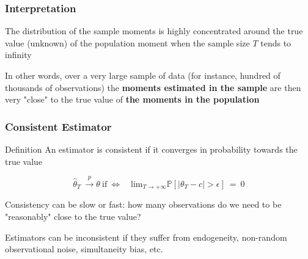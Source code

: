 \documentclass{beamer}
\newenvironment{wideitemize}{\itemize\addtolength{\itemsep}{10pt}}{\enditemize}
\newenvironment{wideenumerate}{\enumerate\addtolength{\itemsep}{10pt}}{\endenumerate}
\begin{document}
  \begin{frame}
    \frametitle{Interpretation}
    \begin{wideenumerate}
    \item The distribution of the sample moments is highly concentrated around the true value (unknown) of the population moment when the sample size $T$ tends to infinity
    \item In other words, over a very large sample of data (for instance, hundred of thousands of observations) the \textbf{moments estimated in the sample} are then very "close" to the true value of \textbf{the moments in the population}
    \end{wideenumerate}
  \end{frame}
  

  \begin{frame}
    \frametitle{Consistent Estimator}
    \begin{alertblock}{Definition}
      An estimator is consistent if it converges in probability towards the true value

      \begin{equation*}
        \hat{\theta}_T \ \overset{p}{\to} \theta \ \text{if} \ \Leftrightarrow \quad \text{lim}_{T \to +\infty} \mathbb{P} \left[ |\theta_T - c| > \epsilon \right] \ = \ 0      
      \end{equation*}
    \end{alertblock}

    \begin{wideitemize}
      \item Consistency can be slow or fast: how many observations do we need to be "reasonably" close to the true value?
      \item Estimators can be inconsistent if they suffer from endogeneity, non-random observational noise, simultaneity bias, etc.  
    \end{wideitemize}
    
  \end{frame}
\end{document}
